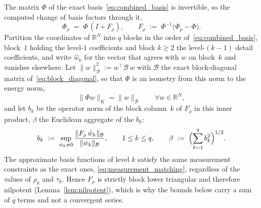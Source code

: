 \documentclass[hidelinks]{siamart}
\theoremstyle{nonumberplain}
\numberwithin{theorem}{section}
\begin{document}
The matrix $\Phi$ of the exact basis~\eqref{eq:combined_basis} is
invertible, so the computed change of basis factors through it,
\begin{equation}\label{eq:F_def}
  \Phi_\rho \;=\; \Phi\,(I + F_\rho),
  \qquad
  F_\rho \;:=\; \Phi^{-1}\bigl(\Phi_\rho - \Phi\bigr) .
\end{equation}
Partition the coordinates of $\mathbb{R}^N$ into $q$ blocks in the order
of~\eqref{eq:combined_basis}, block~$1$ holding the level-$1$
coefficients and block $k \geq 2$ the level-$(k{-}1)$ detail
coefficients, and write $\hat{w}_k$ for the vector that agrees with $w$
on block~$k$ and vanishes elsewhere.  Let
$\|w\|_{\mathcal{B}}^2 := w^\top \mathcal{B}\, w$ with $\mathcal{B}$ the exact
block-diagonal matrix of~\eqref{eq:block_diagonal}, so that $\Phi$ is an
isometry from this norm to the energy norm,
\begin{equation}\label{eq:isometry}
  \|\Phi w\|_K = \|w\|_{\mathcal{B}} \qquad \forall w \in \mathbb{R}^N ,
\end{equation}
and let $b_k$ be the operator norm of the block column~$k$ of $F_\rho$
in this inner product, $\beta$ the Euclidean aggregate of the $b_k$:
\begin{equation}\label{eq:b_k_def}
  b_k \;:=\; \sup_{\hat{w}_k \neq 0}
    \frac{\|F_\rho\, \hat{w}_k\|_{\mathcal{B}}}{\|\hat{w}_k\|_{\mathcal{B}}},
  \qquad 1 \leq k \leq q,
  \qquad
  \beta \;:=\; \Bigl(\sum_{k=1}^{q} b_k^2\Bigr)^{1/2} .
\end{equation}
The approximate basis functions of level $k$ satisfy the same
measurement constraints as the exact ones,
\eqref{eq:measurement_matching}, regardless of the values of $\rho_k$
and $\tau_k$.  Hence $F_\rho$ is strictly block lower triangular and
therefore nilpotent (Lemma~\ref{lem:nilpotent}), which is why the bounds
below carry a sum of $q$ terms and not a convergent series.
\end{document}
